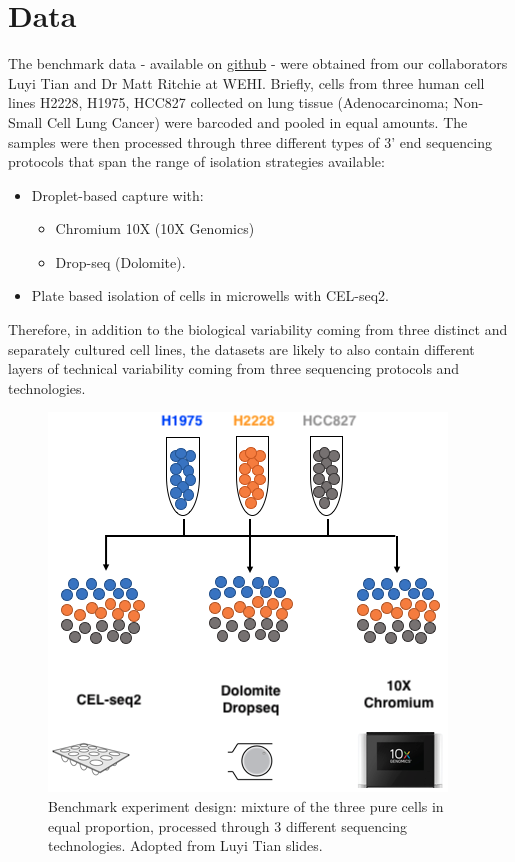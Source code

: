 \documentclass[]{book}
\providecommand{\tightlist}{%
  \setlength{\itemsep}{0pt}\setlength{\parskip}{0pt}}
\theoremstyle{definition}
\theoremstyle{definition}
\theoremstyle{definition}
\theoremstyle{remark}
\begin{document}
\hypertarget{data}{%
\section{Data}\label{data}}

The benchmark data - available on
\href{https://github.com/LuyiTian/CellBench_data}{github} - were
obtained from our collaborators Luyi Tian and Dr Matt Ritchie at WEHI.
Briefly, cells from three human cell lines H2228, H1975, HCC827
collected on lung tissue (Adenocarcinoma; Non-Small Cell Lung Cancer)
were barcoded and pooled in equal amounts. The samples were then
processed through three different types of 3' end sequencing protocols
that span the range of isolation strategies available:

\begin{itemize}
\tightlist
\item
  Droplet-based capture with:

  \begin{itemize}
  \tightlist
  \item
    Chromium 10X (10X Genomics)
  \item
    Drop-seq (Dolomite).
  \end{itemize}
\item
  Plate based isolation of cells in microwells with CEL-seq2.
\end{itemize}

Therefore, in addition to the biological variability coming from three
distinct and separately cultured cell lines, the datasets are likely to
also contain different layers of technical variability coming from three
sequencing protocols and technologies.

\begin{figure}[ht]

{\centering \includegraphics[width=0.45\linewidth]{figures/exp_design3} 

}

\caption{Benchmark experiment design: mixture of the three pure cells in equal proportion, processed through 3 different sequencing technologies. Adopted from Luyi Tian slides.}\label{fig:1-Experimental-Design}
\end{figure}
\end{document}

